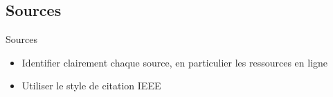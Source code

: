 \subsection{Sources}
\label{sec:Sources}

\begin{frame}[c]{Sources}
    \begin{itemize}
        \item Identifier clairement chaque source, en particulier les ressources en ligne
        \item Utiliser le style de citation IEEE
    \end{itemize}
    \nocite{*}
    \printbibliography
\end{frame}